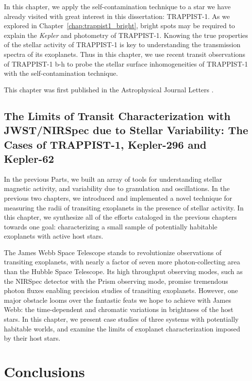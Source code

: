 \documentclass[12pt, twoside]{uwthesis}
\newcommand{\kepler}{\textsl{Kepler}\xspace}
\begin{document}
In this chapter, we apply the self-contamination technique to a star we have already visited with great interest in this dissertation: TRAPPIST-1. As we explored in Chapter~\ref{chap:trappist1_bright}, bright spots may be required to explain the \kepler and \spitzer photometry of TRAPPIST-1. Knowing the true properties of the stellar activity of TRAPPIST-1 is key to understanding the transmission spectra of its exoplanets. Thus in this chapter, we use recent \spitzer transit observations of TRAPPIST-1 b-h to probe the stellar surface inhomogeneities of TRAPPIST-1 with the self-contamination technique.

This chapter was first published in the Astrophysical Journal Letters \citep{Morris2018f}.



\chapter{The Limits of Transit Characterization with JWST/NIRSpec due to Stellar Variability: The Cases of TRAPPIST-1, Kepler-296 and Kepler-62} \label{chapter:jwst_nirspc}

In the previous Parts, we built an array of tools for understanding stellar magnetic activity, and variability due to granulation and oscillations. In the previous two chapters, we introduced and implemented a novel technique for measuring the radii of transiting exoplanets in the presence of stellar activity. In this chapter, we synthesize all of the efforts cataloged in the previous chapters towards one goal: characterizing a small sample of potentially habitable exoplanets with active host stars. 

The James Webb Space Telescope stands to revolutionize observations of transiting exoplanets, with nearly a factor of seven more photon-collecting area than the Hubble Space Telescope. Its high throughput observing modes, such as the NIRSpec detector with the Prism observing mode, promise tremendous photon fluxes enabling precision studies of transiting exoplanets. However, one major obstacle looms over the fantastic feats we hope to achieve with James Webb: the time-dependent and chromatic variations in brightness of the host stars. In this chapter, we present case studies of three systems with potentially habitable worlds, and examine the limits of exoplanet characterization imposed by their host stars. 

\part{Conclusions} \label{part:conclusion}
\end{document}
